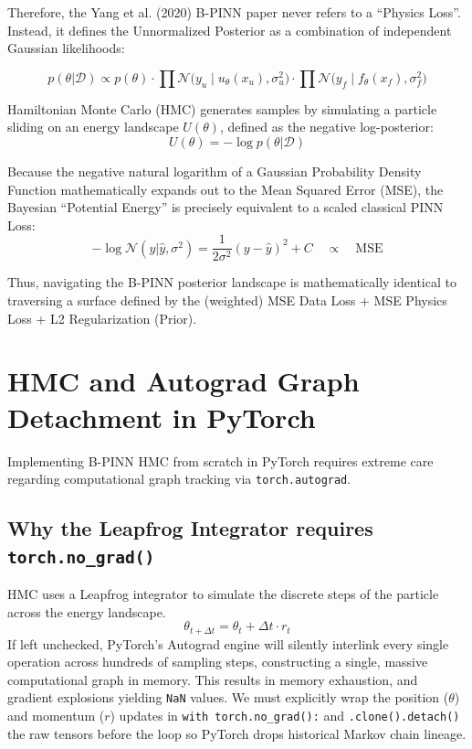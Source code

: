 \documentclass[11pt, a4paper]{article}
\begin{document}
Therefore, the Yang et al. (2020) B-PINN paper never refers to a ``Physics Loss''. Instead, it defines the Unnormalized Posterior as a combination of independent Gaussian likelihoods:

$$ p(\theta | \mathcal{D}) \propto p(\theta) \cdot \prod \mathcal{N}\Big(y_u \mid u_\theta(x_u), \sigma_u^2\Big) \cdot \prod \mathcal{N}\Big(y_f \mid f_\theta(x_f), \sigma_f^2\Big) $$

Hamiltonian Monte Carlo (HMC) generates samples by simulating a particle sliding on an energy landscape $U(\theta)$, defined as the negative log-posterior:
$$ U(\theta) = -\log p(\theta | \mathcal{D}) $$

Because the negative natural logarithm of a Gaussian Probability Density Function mathematically expands out to the Mean Squared Error (MSE), the Bayesian ``Potential Energy'' is precisely equivalent to a scaled classical PINN Loss:
$$ -\log \mathcal{N}(y | \hat{y}, \sigma^2) = \frac{1}{2\sigma^2}(y - \hat{y})^2 + C \quad \propto \quad \text{MSE} $$

Thus, navigating the B-PINN posterior landscape is mathematically identical to traversing a surface defined by the (weighted) MSE Data Loss + MSE Physics Loss + L2 Regularization (Prior).

\section{HMC and Autograd Graph Detachment in PyTorch}

Implementing B-PINN HMC from scratch in PyTorch requires extreme care regarding computational graph tracking via \texttt{torch.autograd}.

\subsection{Why the Leapfrog Integrator requires \texttt{torch.no\_grad()}}
HMC uses a Leapfrog integrator to simulate the discrete steps of the particle across the energy landscape. 
$$ \theta_{t+\Delta t} = \theta_t + \Delta t \cdot r_t $$
If left unchecked, PyTorch's Autograd engine will silently interlink every single operation across hundreds of sampling steps, constructing a single, massive computational graph in memory. This results in memory exhaustion, and gradient explosions yielding \texttt{NaN} values. We must explicitly wrap the position ($\theta$) and momentum ($r$) updates in \texttt{with torch.no\_grad():} and \texttt{.clone().detach()} the raw tensors before the loop so PyTorch drops historical Markov chain lineage.
\end{document}
